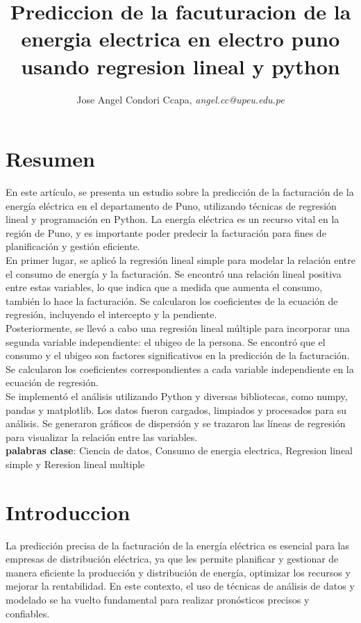 \documentclass{article}
\title{Prediccion de la facuturacion de la energia electrica en electro puno usando regresion lineal y python}
\author{Jose Angel Condori Ccapa, {\textit {angel.cc@upeu.edu.pe}}}
\begin{document}
\maketitle
\section{Resumen}

En este artículo, se presenta un estudio sobre la predicción de la facturación de la energía eléctrica en el departamento de Puno, utilizando técnicas de regresión lineal y programación en Python. La energía eléctrica es un recurso vital en la región de Puno, y es importante poder predecir la facturación para fines de planificación y gestión eficiente.
\\

En primer lugar, se aplicó la regresión lineal simple para modelar la relación entre el consumo de energía y la facturación. Se encontró una relación lineal positiva entre estas variables, lo que indica que a medida que aumenta el consumo, también lo hace la facturación. Se calcularon los coeficientes de la ecuación de regresión, incluyendo el intercepto y la pendiente.
\\

Posteriormente, se llevó a cabo una regresión lineal múltiple para incorporar una segunda variable independiente: el ubigeo de la persona. Se encontró que el consumo y el ubigeo son factores significativos en la predicción de la facturación. Se calcularon los coeficientes correspondientes a cada variable independiente en la ecuación de regresión.
\\

Se implementó el análisis utilizando Python y diversas bibliotecas, como numpy, pandas y matplotlib. Los datos fueron cargados, limpiados y procesados para su análisis. Se generaron gráficos de dispersión y se trazaron las líneas de regresión para visualizar la relación entre las variables.
\\

\textbf{palabras clase}: Ciencia de datos, Consumo de energia electrica, Regresion lineal simple y  Reresion lineal multiple

\section{Introduccion}
La predicción precisa de la facturación de la energía eléctrica es esencial para las empresas de distribución eléctrica, ya que les permite planificar y gestionar de manera eficiente la producción y distribución de energía, optimizar los recursos y mejorar la rentabilidad. En este contexto, el uso de técnicas de análisis de datos y modelado se ha vuelto fundamental para realizar pronósticos precisos y confiables.
\\
\end{document}
